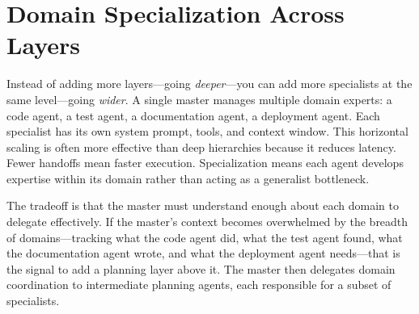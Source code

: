 \section{Domain Specialization Across Layers}\label{sec:specialization}

Instead of adding more layers—going \textit{deeper}—you can add more specialists at the same level—going \textit{wider}. A single master manages multiple domain experts: a code agent, a test agent, a documentation agent, a deployment agent. Each specialist has its own system prompt, tools, and context window. This horizontal scaling is often more effective than deep hierarchies because it reduces latency. Fewer handoffs mean faster execution. Specialization means each agent develops expertise within its domain rather than acting as a generalist bottleneck.

The tradeoff is that the master must understand enough about each domain to delegate effectively. If the master's context becomes overwhelmed by the breadth of domains—tracking what the code agent did, what the test agent found, what the documentation agent wrote, and what the deployment agent needs—that is the signal to add a planning layer above it. The master then delegates domain coordination to intermediate planning agents, each responsible for a subset of specialists.

